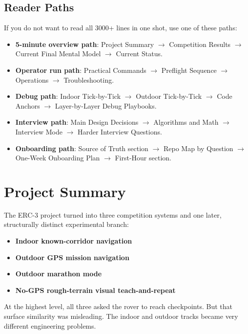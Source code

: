 \documentclass[11pt]{article}
\begin{document}
\subsection*{Reader Paths}

If you do not want to read all 3000+ lines in one shot, use one of these paths:

\begin{itemize}[nosep]
  \item \textbf{5-minute overview path}: Project Summary $\rightarrow$ Competition
  Results $\rightarrow$ Current Final Mental Model $\rightarrow$ Current Status.
  \item \textbf{Operator run path}: Practical Commands $\rightarrow$ Preflight
  Sequence $\rightarrow$ Operations $\rightarrow$ Troubleshooting.
  \item \textbf{Debug path}: Indoor Tick-by-Tick $\rightarrow$ Outdoor Tick-by-Tick
  $\rightarrow$ Code Anchors $\rightarrow$ Layer-by-Layer Debug Playbooks.
  \item \textbf{Interview path}: Main Design Decisions $\rightarrow$ Algorithms and
  Math $\rightarrow$ Interview Mode $\rightarrow$ Harder Interview Questions.
  \item \textbf{Onboarding path}: Source of Truth section $\rightarrow$ Repo Map by
  Question $\rightarrow$ One-Week Onboarding Plan $\rightarrow$ First-Hour section.
\end{itemize}

\section{Project Summary}

The ERC-3 project turned into three competition systems and one later,
structurally distinct experimental branch:

\begin{itemize}[nosep]
  \item \textbf{Indoor known-corridor navigation}
  \item \textbf{Outdoor GPS mission navigation}
  \item \textbf{Outdoor marathon mode}
  \item \textbf{No-GPS rough-terrain visual teach-and-repeat}
\end{itemize}

At the highest level, all three asked the rover to reach checkpoints. But that
surface similarity was misleading. The indoor and outdoor tracks became very
different engineering problems.
\end{document}
